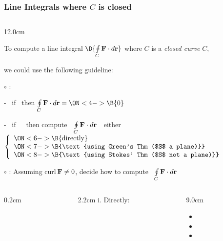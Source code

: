 \begin{frame}
\frametitle{Line Integrals where $C$ is closed}
\scriptsize
\begin{columns}
\begin{column}{12.0cm}

To compute a line integral \quad $\D{\oint \limits_{C} {\bf F} \cdot d{\bf r}}$ \quad where $C$ is a {\em closed curve} $C$, 

\vspace{0.4cm}

we could use the following guideline:

\vspace{0.4cm}

$\circ$ : \quad 
{}

\vspace{0.2cm}

\hspace{0.8cm} - \, if \, 
 \quad then \quad $\oint \limits_{C} {\bf F} \cdot d{\bf r} = 
\ON<4->{\B{0}}$

\vspace{0.2cm}

\hspace{0.8cm} - \, if \, 
 \,\, then compute \,\, $\oint \limits_{C} {\bf F} \cdot d{\bf r}$ \,\, either \,
$\left\{
\begin{array}{l}
	\ON<6->{\B{\text{directly}}}\\
	\ON<7->{\B{\text{using Green's Thm ($S$ a plane)}}}\\
	\ON<8->{\B{\text{using Stokes' Thm ($S$ not a plane)}}}
\end{array}
\right.$

\vspace{0.6cm}

$\circ$ : Assuming curl\,{${\bf F} \ne 0$}, decide how to compute \, $\oint \limits_{C} {\bf F} \cdot d{\bf r}$

\begin{columns}
\begin{column}{0.2cm}
\end{column}
\begin{column}{2.2cm}
	i. Directly:
	
	\vspace{1.2cm}
\end{column}
\begin{column}{9.0cm}
\begin{itemize}
	\item {}
	\vspace{0.2cm}
	\item {}
	\vspace{0.2cm}
	\item {}
\end{itemize}
\end{column}
\end{columns}


\end{column}
\end{columns}
\end{frame}

